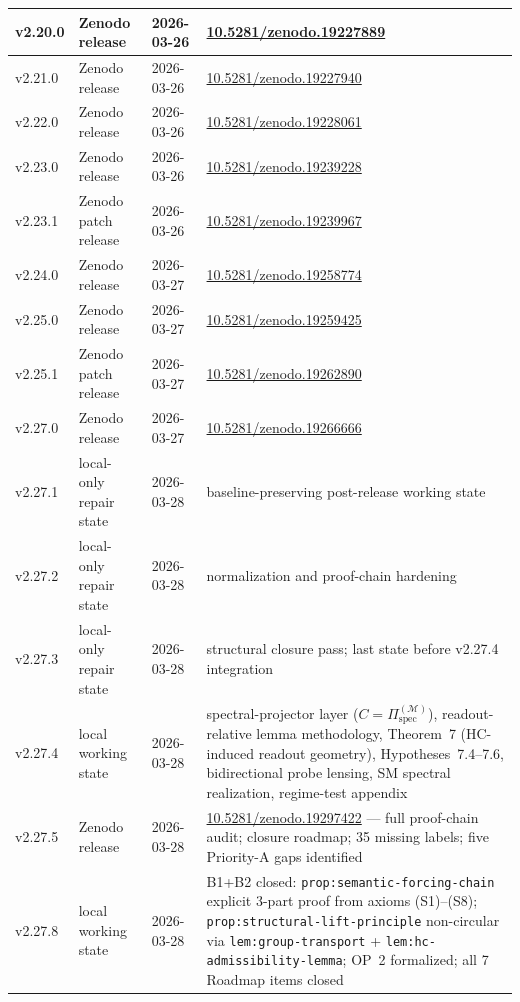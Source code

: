 {\begin{longtable}{|p{}|p{}|p{}|p{}|}
\hline
v2.20.0 & Zenodo release & 2026-03-26 & \href{https://doi.org/10.5281/zenodo.19227889}{10.5281/zenodo.19227889} \\
\hline
v2.21.0 & Zenodo release & 2026-03-26 & \href{https://doi.org/10.5281/zenodo.19227940}{10.5281/zenodo.19227940} \\
\hline
v2.22.0 & Zenodo release & 2026-03-26 & \href{https://doi.org/10.5281/zenodo.19228061}{10.5281/zenodo.19228061} \\
\hline
v2.23.0 & Zenodo release & 2026-03-26 & \href{https://doi.org/10.5281/zenodo.19239228}{10.5281/zenodo.19239228} \\
\hline
v2.23.1 & Zenodo patch release & 2026-03-26 & \href{https://doi.org/10.5281/zenodo.19239967}{10.5281/zenodo.19239967} \\
\hline
v2.24.0 & Zenodo release & 2026-03-27 & \href{https://doi.org/10.5281/zenodo.19258774}{10.5281/zenodo.19258774} \\
v2.25.0 & Zenodo release & 2026-03-27 & \href{https://doi.org/10.5281/zenodo.19259425}{10.5281/zenodo.19259425} \\
 v2.25.1 & Zenodo patch release & 2026-03-27 & \href{https://doi.org/10.5281/zenodo.19262890}{10.5281/zenodo.19262890} \\
\hline
v2.27.0 & Zenodo release & 2026-03-27 & \href{https://doi.org/10.5281/zenodo.19266666}{10.5281/zenodo.19266666} \\
\hline
v2.27.1 & local-only repair state & 2026-03-28 & baseline-preserving post-release working state \\
\hline
v2.27.2 & local-only repair state & 2026-03-28 & normalization and proof-chain hardening \\
\hline
v2.27.3 & local-only repair state & 2026-03-28 & structural closure pass; last state before v2.27.4 integration \\
\hline
v2.27.4 & local working state & 2026-03-28 & spectral-projector layer ($C=\Pi^{(\mathcal{M})}_{\mathrm{spec}}$), readout-relative lemma methodology, Theorem~7 (HC-induced readout geometry), Hypotheses~7.4--7.6, bidirectional probe lensing, SM spectral realization, regime-test appendix \\
\hline
v2.27.5 & Zenodo release & 2026-03-28 & \href{https://doi.org/10.5281/zenodo.19297422}{10.5281/zenodo.19297422} — full proof-chain audit; closure roadmap; 35 missing labels; five Priority-A gaps identified \\
\hline
v2.27.8 & local working state & 2026-03-28 & B1+B2 closed: \texttt{prop:semantic-forcing-chain} explicit 3-part proof from axioms (S1)--(S8); \newline \texttt{prop:structural-lift-principle} non-circular via \texttt{lem:group-transport} + \texttt{lem:hc-admissibility-lemma}; \newline OP~2 formalized; all 7 Roadmap items closed \\

\end{longtable}}
